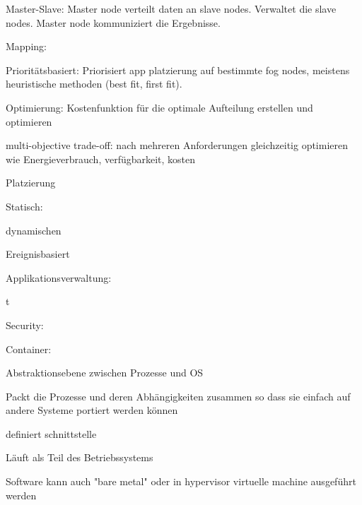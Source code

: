 \begin{notes}
\begin{notes}
\begin{notes}
\begin{notes}
                \item Master-Slave: Master node verteilt daten an slave nodes. Verwaltet die slave nodes. Master node kommuniziert die Ergebnisse.
            \end{notes}
            \item Mapping:
            \begin{notes}
                \item Prioritätsbasiert: Priorisiert app platzierung auf bestimmte fog nodes, meistens heuristische methoden (best fit, first fit). 
                \item Optimierung: Kostenfunktion für die optimale Aufteilung erstellen und optimieren
                \item multi-objective trade-off: nach mehreren Anforderungen gleichzeitig optimieren wie Energieverbrauch, verfügbarkeit, kosten
            \end{notes}
            \item Platzierung
            \begin{notes}
                \item Statisch: 
                \item dynamischen
                \item Ereignisbasiert
            \end{notes}
        \end{notes}
        \item Applikationsverwaltung:
        \begin{notes}
            \item t
        \end{notes}
    \end{notes}
    \item Security:
    \begin{notes}
        \item Container:
        \begin{notes}
            \item Abstraktionsebene zwischen Prozesse und OS
            \item Packt die Prozesse und deren Abhängigkeiten zusammen so dass sie einfach auf andere Systeme portiert werden können
            \item definiert schnittstelle
            \item Läuft als Teil des Betriebssystems
            \item Software kann auch "bare metal" oder in hypervisor virtuelle machine ausgeführt werden

\end{notes}
\end{notes}
\end{notes}

